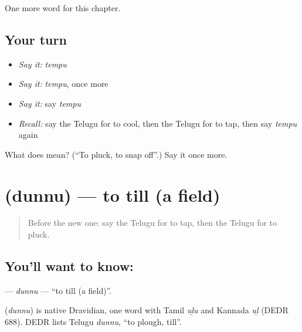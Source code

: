 \begin{grammarlens}[title={What you've built}]
One more word for this chapter.
\end{grammarlens}

\subsection*{Your turn}
\begin{itemize}
\raggedright
  \item \emph{Say it:} \emph{tempu}
  \item \emph{Say it:} \emph{tempu}, once more
  \item \emph{Say it:} say \emph{tempu}
  \item \emph{Recall:} say the Telugu for to cool, then the Telugu for to tap, then say \emph{tempu} again
\end{itemize}

\begin{tcolorbox}[breakable,colback=teal!4,colframe=teal!35!black,title={Before you move on}]
What does  mean? (\textquotedblleft{}To pluck, to snap off\textquotedblright{}.) Say it once more.
\end{tcolorbox}
\section[\texorpdfstring{\te{దున్ను} (dunnu)}{దున్ను (dunnu)}]{ (dunnu) — to till (a field)}

\label{lesson:TE-C207-dunnu}



\begin{quote}
Before the new one: say the Telugu for to tap, then the Telugu for to pluck.
\end{quote}

\subsection*{You'll want to know: }
\textbf{} — \emph{dunnu} — \textquotedblleft{}to till (a field)\textquotedblright{}.

\begin{cousinweb}
\textbf{} (\emph{dunnu}) is native Dravidian, one word with Tamil \emph{uḻu} and Kannada \emph{uḻ} (DEDR 688). DEDR lists Telugu \emph{dunnu}, \textquotedblleft{}to plough, till\textquotedblright{}.
\end{cousinweb}


